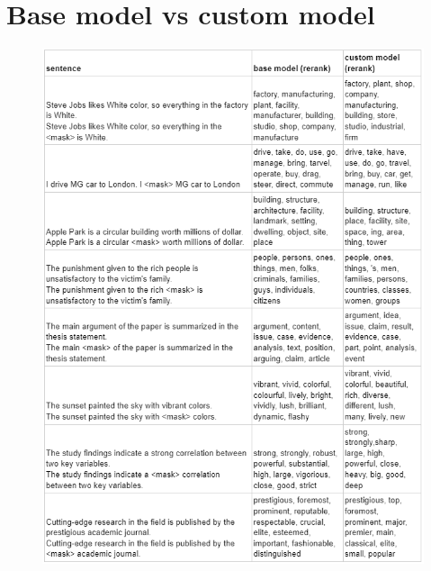 \documentclass[12pt,oneside,openright,a4paper]{cpe-english-project}
\begin{document}
\newpage
\section{Base model vs custom model}
\begin{figure}[!h]\centering
\includegraphics{./img/Appendix/BasevsCustom.png}
\end{figure}

\newpage
\end{document}
